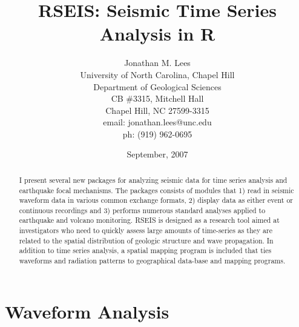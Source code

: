 \documentclass{article}
\begin{document}








\author{Jonathan M. Lees\\
University of North Carolina, Chapel Hill\\
Department of Geological Sciences\\
CB \#3315, Mitchell Hall\\
Chapel Hill, NC  27599-3315\\
email: jonathan.lees@unc.edu\\
ph: (919) 962-0695
}
\title{RSEIS: Seismic Time Series Analysis in R}
\date{September, 2007}

\maketitle


\begin{abstract}
I present several new packages for analyzing seismic data for time
series analysis and earthquake focal mechanisms.  The packages
consists of modules that 1) read in seismic waveform data in various
common exchange formats, 2) display data as either event or continuous
recordings and 3) performs numerous standard analyses applied to
earthquake and volcano monitoring.  RSEIS is designed as a research
tool aimed at investigators who need to quickly assess large amounts
of time-series as they are related to the spatial distribution of
geologic structure and wave propagation.  In addition to time series
analysis, a spatial mapping program is included that ties waveforms
and radiation patterns to geographical data-base and mapping programs.
\end{abstract}


\section{Waveform Analysis}
\end{document}
